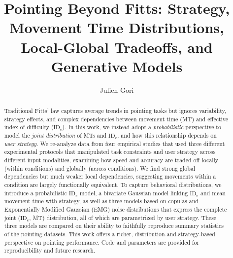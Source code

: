 \documentclass[acmlarge, manuscript,review]{acmart}
\title{Pointing Beyond Fitts: Strategy, Movement Time Distributions, Local-Global Tradeoffs, and Generative Models}
\author{Julien Gori}
\affiliation{%
  \institution{Sorbonne Université, CNRS, Inserm, Institut des Systèmes Intelligents et de Robotique, ISIR}
  \city{F-75005 Paris}
  \country{France}
}
\newcommand{\ide}{\ensuremath{{\text{ID}_e}}\xspace}
\begin{document}
\begin{abstract}
  Traditional Fitts' law captures average trends in pointing tasks but ignores variability, strategy effects, and complex dependencies between movement time (MT) and effective index of difficulty (\ide).
  In this work, we instead adopt a \textit{probabilistic} perspective to model the \textit{joint distribution} of MTs and \ide, and how this relationship depends on \textit{user strategy}.
  We re-analyze data from four empirical studies that used three different experimental protocols that manipulated task constraints and user strategy across different input modalities, examining how speed and accuracy are traded off locally (within conditions) and globally (across conditions). We find strong global dependencies but much weaker local dependencies, suggesting movements within a condition are largely functionally equivalent.
  To capture behavioral distributions, we introduce a probabilistic \ide model, a bivariate Gaussian model linking \ide and mean movement time with strategy, as well as three models based on copulas and Exponentially Modified Gaussian (EMG) noise distributions that express the complete joint (\ide, MT) distribution, all of which are parametrized by user strategy. These three models are compared on their ability to faithfully reproduce summary statistics of the pointing datasets. This work offers a richer, distribution-and-strategy-based perspective on pointing performance. Code and parameters are provided for reproducibility and future research.
\end{abstract}
\maketitle

\end{document}
